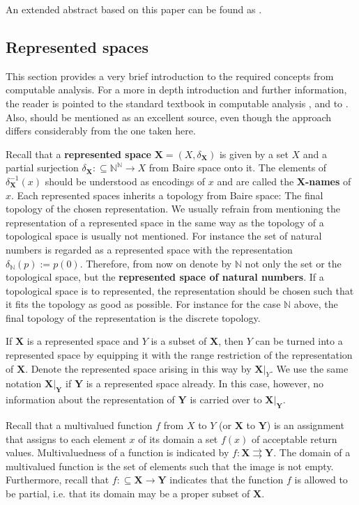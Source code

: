 \documentclass{eptcs-modified}
\newcommand{\Baire}{{\mathbb{N}^\mathbb{N}}}
\newcommand{\mto}{\rightrightarrows}
\newcommand{\demph}{\textbf}
\newcommand{\NN}{\mathbb{N}}
\newcommand{\XX}{\mathbf{X}}
\newcommand{\YY}{\mathbf{Y}}
\begin{document}
		An extended abstract based on this paper can be found as \cite{pauly-steinberg-csr}.

		\subsection{Represented spaces}
			This section provides a very brief introduction to the required concepts from computable analysis.
			For a more in depth introduction and further information, the reader is pointed to the standard textbook in computable analysis \cite{MR1795407}, and to \cite{pauly-synthetic}.
			Also, \cite{MR1005942} should be mentioned as an excellent source, even though the approach differs considerably from the one taken here.
		
			Recall that a \demph{represented space} $\mathbf{X} = (X, \delta_\mathbf{X})$ is given by a set $X$ and a partial surjection $\delta_\mathbf{X}: \subseteq \Baire \to X$ from Baire space onto it.
			The elements of $\delta^{-1}_{\XX}(x)$ should be understood as encodings of $x$ and are called the \demph{$\XX$-names} of $x$.
			Each represented spaces inherits a topology from Baire space:
			The final topology of the chosen representation.
			We usually refrain from mentioning the representation of a represented space in the same way as the topology of a topological space is usually not mentioned.
			For instance the set of natural numbers is regarded as a represented space with the representation $\delta_{\NN}(p) := p(0)$.
			Therefore, from now on denote by $\NN$ not only the set or the topological space, but the \demph{represented space of natural numbers}.
			If a topological space is to represented, the representation should be chosen such that it fits the topology as good as possible.
			For instance for the case $\NN$ above, the final topology of the representation is the discrete topology.

			If $\XX$ is a represented space and $Y$ is a subset of $\XX$, then $Y$ can be turned into a represented space by equipping it with the range restriction of the representation of $\XX$.
			Denote the represented space arising in this way by $\XX|_{Y}$.
			We use the same notation $\XX|_{\YY}$ if $\YY$ is a represented space already.
			In this case, however, no information about the representation of $\YY$ is carried over to $\XX|_{\YY}$.
			
			Recall that a multivalued function $f$ from $X$ to $Y$ (or $\XX$ to $\YY$) is an assignment that assigns to each element $x$ of its domain a set $f(x)$ of acceptable return values.
			Multivaluedness of a function is indicated by $f:\XX\mto\YY$.
			The domain of a multivalued function is the set of elements such that the image is not empty.
			Furthermore, recall that $f:\subseteq \XX\to\YY$ indicates that the function $f$ is allowed to be partial, i.e. that its domain may be a proper subset of $\XX$.
\end{document}

